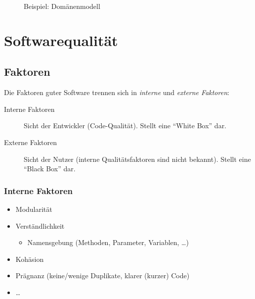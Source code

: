 				\begin{figure}[ht]
					\centering
					\caption{Beispiel: Domänenmodell}
					\label{fig:domain}
				\end{figure}

\chapter{Softwarequalität}
	\section{Faktoren}
		Die Faktoren guter Software trennen sich in \textit{interne} und \textit{externe Faktoren}:
		\begin{description}
			\item[Interne Faktoren] Sicht der Entwickler (Code-Qualität). Stellt eine \enquote{White Box} dar.
			\item[Externe Faktoren] Sicht der Nutzer (interne Qualitätsfaktoren sind nicht bekannt). Stellt eine \enquote{Black Box} dar.
		\end{description}
	
		\subsection{Interne Faktoren}
			\begin{itemize}
				\item Modularität
				\item Verständlichkeit
					\begin{itemize}
						\item Namensgebung (Methoden, Parameter, Variablen, \dots)
					\end{itemize}
				\item Kohäsion
				\item Prägnanz (keine/wenige Duplikate, klarer (kurzer) Code)
				\item \dots
			\end{itemize}
		
